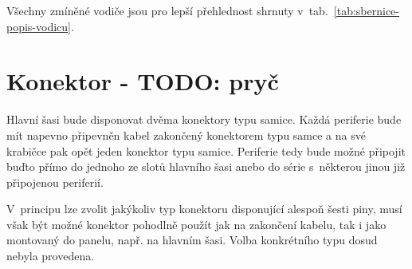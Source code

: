     Všechny zmíněné vodiče jsou pro lepší přehlednost shrnuty v~tab.~\ref{tab:sbernice-popis-vodicu}.

\section{Konektor - TODO: pryč}
    Hlavní šasi bude disponovat dvěma konektory typu samice. Každá periferie bude mít napevno připevněn kabel zakončený konektorem typu samce a na své krabičce pak opět jeden konektor typu samice. Periferie tedy bude možné připojit buďto přímo do jednoho ze slotů hlavního šasi anebo do série s~některou jinou již připojenou periferií. 

    V~principu lze zvolit jakýkoliv typ konektoru disponující alespoň šesti piny, musí však být možné konektor pohodlně použít jak na zakončení kabelu, tak i jako montovaný do panelu, např. na hlavním šasi. Volba konkrétního typu dosud nebyla provedena.


            

            